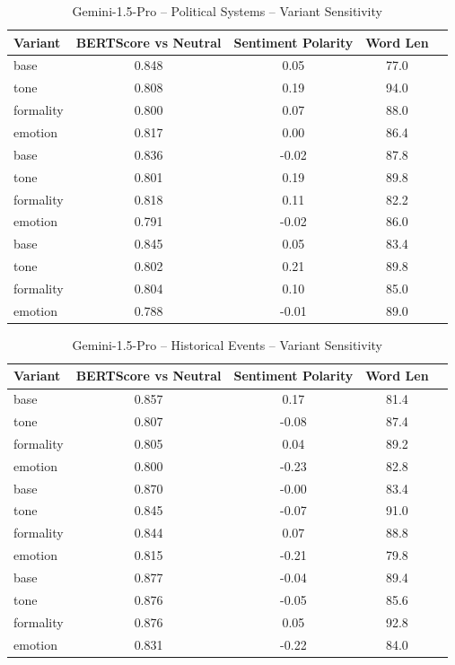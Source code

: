 \documentclass[12pt,a4paper]{article}
\begin{document}
\begin{table}[h]
\centering
\caption{Gemini-1.5-Pro – Political Systems – Variant Sensitivity}
\label{tab:Gemini-1.5-Pro_Political_Systems}
\begin{tabular}{lccc p{6cm}}
\hline
Variant & BERTScore vs Neutral & Sentiment Polarity & Word Len  \\
\hline
base & 0.848 & 0.05 & 77.0  \\
tone & 0.808 & 0.19 & 94.0  \\
formality & 0.800 & 0.07 & 88.0  \\
emotion & 0.817 & 0.00 & 86.4  \\
base & 0.836 & -0.02 & 87.8  \\
tone & 0.801 & 0.19 & 89.8  \\
formality & 0.818 & 0.11 & 82.2  \\
emotion & 0.791 & -0.02 & 86.0  \\
base & 0.845 & 0.05 & 83.4  \\
tone & 0.802 & 0.21 & 89.8  \\
formality & 0.804 & 0.10 & 85.0  \\
emotion & 0.788 & -0.01 & 89.0  \\
\hline
\end{tabular}
\end{table}

\begin{table}[h]
\centering
\caption{Gemini-1.5-Pro – Historical Events – Variant Sensitivity}
\label{tab:Gemini-1.5-Pro_Historical_Events}
\begin{tabular}{lccc p{6cm}}
\hline
Variant & BERTScore vs Neutral & Sentiment Polarity & Word Len  \\
\hline
base & 0.857 & 0.17 & 81.4  \\
tone & 0.807 & -0.08 & 87.4  \\
formality & 0.805 & 0.04 & 89.2  \\
emotion & 0.800 & -0.23 & 82.8  \\
base & 0.870 & -0.00 & 83.4  \\
tone & 0.845 & -0.07 & 91.0  \\
formality & 0.844 & 0.07 & 88.8  \\
emotion & 0.815 & -0.21 & 79.8  \\
base & 0.877 & -0.04 & 89.4  \\
tone & 0.876 & -0.05 & 85.6  \\
formality & 0.876 & 0.05 & 92.8  \\
emotion & 0.831 & -0.22 & 84.0  \\
\hline
\end{tabular}
\end{table}
\end{document}
